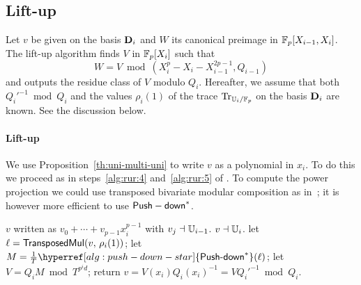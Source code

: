\subsection{Lift-up}
\label{sec:level-embedding:lift-up}

Let $v$ be given on the basis $\mathbf{D}_i$ and $W$ its canonical
preimage in $\mathbb{F}_p[X_{i-1},X_i]$.  The lift-up algorithm finds $V$ in
$\mathbb{F}_p[X_i]$ such that
\begin{equation}
  \label{eq:93}
  W=V \bmod
  (X_i^p-X_i-X_{i-1}^{2p-1},Q_{i-1})
\end{equation}
and outputs the residue class of $V$ modulo $Q_i$. Hereafter, we
assume that both $Q_i'^{-1} \bmod Q_i$ and the values $\rho_i(1)$ of
the trace $\operatorname{Tr}_{\mathbb{U}_i/\mathbb{F}_p}$ on the basis $\mathbf{D}_i$ are known.  See
the discussion below.

\paragraph{Lift-up}
We use Proposition~\ref{th:uni-multi-uni} to write $v$ as a
polynomial in $x_i$. To do this we proceed as in steps~\ref{alg:rur:4}
and~\ref{alg:rur:5} of \hyperref[alg:rur]{}.  To compute the power projection we
could use transposed bivariate modular composition as
in~\cite{shoup99}; it is however more efficient to use
\hyperref[alg:push-down-star]{${\sf Push-down}^\ast$}.

\begin{algorithm}
  \caption{\label{alg:liftup}}
  \begin{algorithmic}[1]
    \REQUIRE $v$ written as $v_0+\cdots+v_{p-1}x_i^{p-1}$ with $v_j \dashv \mathbb{U}_{i-1}$.
    \ENSURE $v\dashv \mathbb{U}_i$.
    \STATE \label{alg:lift-up:transmul} let $\ell = {\sf TransposedMul}(v,\,\rho_i(1))$;
    \STATE \label{alg:lift-up:pow} let $M=\frac{1}{T}\hyperref[alg:push-down-star]{\dual{{\text{\alg{Push-down}}}}}(\ell)$;
    \STATE \label{alg:lift-up:mult} let $V = Q_iM \bmod T^{p^id}$;
    \STATE \label{alg:lift-up:mulmod} return $v=V(x_i)Q_i(x_i)^{-1} = V {Q_i'}^{-1} \bmod Q_i$.
  \end{algorithmic}
\end{algorithm}

